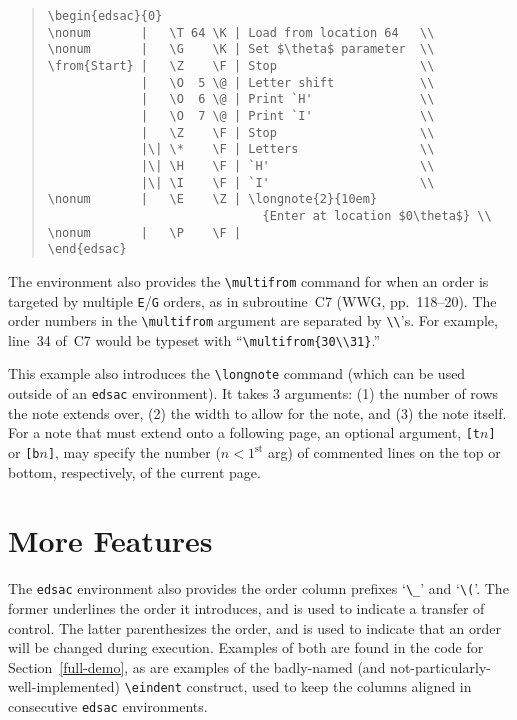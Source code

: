\documentclass[11pt]{article}
\begin{document}
\begin{quote}\small
\begin{verbatim}
\begin{edsac}{0}
\nonum       |   \T 64 \K | Load from location 64   \\
\nonum       |   \G    \K | Set $\theta$ parameter  \\
\from{Start} |   \Z    \F | Stop                    \\
             |   \O  5 \@ | Letter shift            \\
             |   \O  6 \@ | Print `H'               \\
             |   \O  7 \@ | Print `I'               \\
             |   \Z    \F | Stop                    \\
             |\| \*    \F | Letters                 \\
             |\| \H    \F | `H'                     \\
             |\| \I    \F | `I'                     \\
\nonum       |   \E    \Z | \longnote{2}{10em}
                              {Enter at location $0\theta$} \\
\nonum       |   \P    \F | 
\end{edsac}
\end{verbatim}
\end{quote}

The environment also provides the \verb"\multifrom" command for when an
order is targeted by multiple \verb"E"/\verb"G" orders, as in
subroutine~C7 (WWG, pp.\ 118--20).  The order numbers in the
\verb"\multifrom" argument are separated by \verb"\\"'s.  For example,
line~34 of~C7 would be typeset with ``\verb"\multifrom{30\\31}".''

This example also introduces the \verb"\longnote" command (which can
be used outside of an \texttt{edsac} environment).  It
takes 3 arguments:  (1) the number of rows the note extends over,
(2) the width to allow for the note, and (3) the note itself.  For
a note that must extend onto a following page, an optional argument,
\verb"[t"$n$\verb"]" or \verb"[b"$n$\verb"]", may specify the number
($n<1^{\mbox{st}}$ arg)
of commented lines on the top or bottom, respectively,
of the current page.

\section{More Features}
The \texttt{edsac} environment also provides the order column
prefixes `\verb"\_"' and `\verb"\("'.  The former underlines the order
it introduces, and is used to indicate a transfer of control.  The
latter parenthesizes the order, and is used to indicate that an order
will be changed during execution.  Examples of both are found in the
code for Section~\ref{full-demo}, as are examples of the badly-named
(and not-particularly-well-implemented)
\verb"\eindent" construct, used to keep the columns aligned in consecutive
\texttt{edsac} environments.
\end{document}
